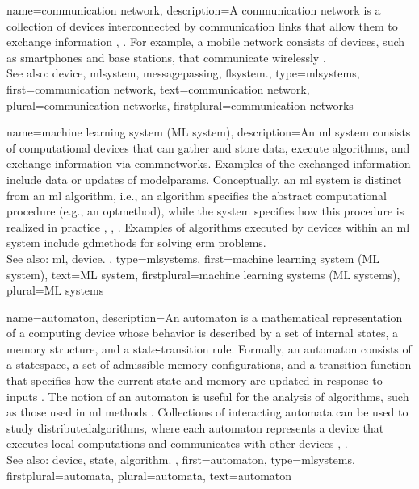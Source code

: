 {name={communication network},
	description={A communication network is a collection
		of \glspl{device} interconnected by communication links that allow them to
		exchange information \cite{DistributedSystems}, \cite{TanenbaumComputerNet}.
		For example, a mobile network consists of \glspl{device}, such as smartphones and base stations,
		that communicate wirelessly \cite{FundWireless}.
		\\
		See also: \gls{device}, \gls{mlsystem}, \gls{messagepassing}, \gls{flsystem}.},
	type=mlsystems,
	first={communication network},
	text={communication network},
	plural={communication networks},
	firstplural={communication networks}
}

{name={machine learning system (ML system)},
	description={An \gls{ml} system 
		consists of computational \glspl{device} that can gather and store \gls{data}, 
		execute \glspl{algorithm}, and exchange information via \glspl{commnetwork}. 
		Examples of the exchanged information include \gls{data} or updates of 
		\glspl{modelparam}. Conceptually, an \gls{ml} system is distinct from 
		an \gls{ml} \gls{algorithm}, i.e., an \gls{algorithm} specifies 
		the abstract computational procedure (e.g., an \gls{optmethod}), 
		while the system specifies how this procedure is realized in practice
		\cite{Sipser2013}, \cite{KnuthAlgoBook}, \cite{tanenbaum2006modern}.
		Examples of \glspl{algorithm} executed by \glspl{device} within an \gls{ml} system include
		\glspl{gdmethod} for solving \gls{erm} problems.
		\\
		See also: \gls{ml}, \gls{device}. },
 	type=mlsystems, 
 	first={machine learning system (ML system)}, 
 	text={ML system},
 	firstplural={machine learning systems (ML systems)},
 	plural={ML systems}
}

{name={automaton},
	description={An automaton is a mathematical representation of a computing \gls{device} 
		whose behavior is described by a set of internal \glspl{state}, a memory 
		structure, and a \gls{state}-transition rule. Formally, an automaton consists 
		of a \gls{statespace}, a set of admissible memory configurations, 
		and a transition \gls{function} that specifies how the current \gls{state} 
		and memory are updated in response to inputs \cite{Sipser2013}. 
		The notion of an automaton is useful for the analysis of \glspl{algorithm}, such 
		as those used in \gls{ml} methods \cite{Cormen:2022aa}. 
		Collections of interacting automata can be used to study \glspl{distributedalgorithm}, 
		where each automaton represents a \gls{device} that executes local computations and 
		communicates with other \glspl{device} \cite{ParallelDistrBook}, \cite{LynchDistributedAlgorithms}.
		\\
		See also: \gls{device}, \gls{state}, \gls{algorithm}. }, 
	first={automaton}, 
	type=mlsystems,
	firstplural={automata}, 
	plural={automata}, 
	text={automaton} 
}

